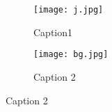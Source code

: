 \documentclass{article}
\begin{document}
\begin{figure}[h]
\begin{subfigure}{0.5\textwidth}
\texttt{[image: j.jpg]}
\caption{Caption1}
\end{subfigure}
\hfill
\begin{subfigure}{0.5\textwidth}
\texttt{[image: bg.jpg]}
\caption{Caption 2}
\end{subfigure}
\end{figure}
\end{document}
